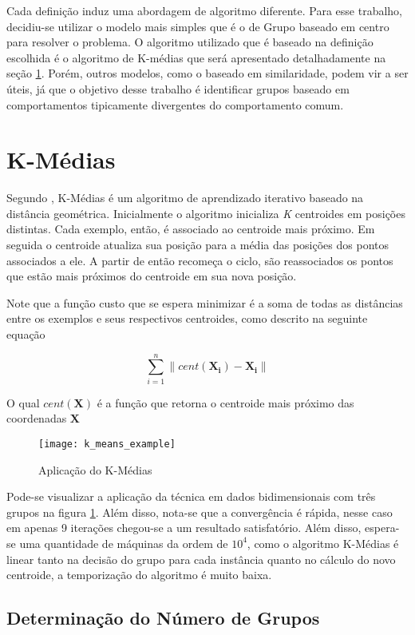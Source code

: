 Cada definição induz uma abordagem de algoritmo diferente. Para esse trabalho, decidiu-se utilizar o modelo mais simples que é o de Grupo baseado em centro para resolver o problema. O algoritmo utilizado que é baseado na definição escolhida é o algoritmo de K-médias que será apresentado detalhadamente na seção \ref{sec:kmeans}. Porém, outros modelos, como o baseado em similaridade, podem vir a ser úteis, já que o objetivo desse trabalho é identificar grupos baseado em comportamentos tipicamente divergentes do comportamento comum.

\section{K-Médias}\label{sec:kmeans}

Segundo \citet{witten2011data}, K-Médias é um algoritmo de aprendizado iterativo baseado na distância geométrica. Inicialmente o algoritmo inicializa \textit{K} centroides em posições distintas. Cada exemplo, então, é associado ao centroide mais próximo. Em seguida o centroide atualiza sua posição para a média das posições dos pontos associados a ele. A partir de então recomeça o ciclo, são reassociados os pontos que estão mais próximos do centroide em sua nova posição.

Note que a função custo que se espera minimizar é a soma de todas as distâncias entre os exemplos e seus respectivos centroides, como descrito na seguinte equação

\[
\sum_{i=1}^{n} \lVert cent(\mathbf{X_{i}}) - \mathbf{X_{i}} \rVert
\]

O qual \(cent(\mathbf{X})\) é a função que retorna o centroide mais próximo das coordenadas \(\mathbf{X}\)

\begin{figure}
\texttt{[image: k\_means\_example]}
\caption[Aplicação do K-Médias]{Aplicação do K-Médias} \label{fig:k_means_example}
\end{figure}

Pode-se visualizar a aplicação da técnica em dados bidimensionais com três grupos na figura \ref{fig:k_means_example}. Além disso, nota-se que a convergência é rápida, nesse caso em apenas 9 iterações chegou-se a um resultado satisfatório. Além disso, espera-se uma quantidade de máquinas da ordem de \(10^4\), como o algoritmo K-Médias é linear tanto na decisão do grupo para cada instância quanto no cálculo do novo centroide, a temporização do algoritmo é muito baixa.

\subsection{Determinação do Número de Grupos}

